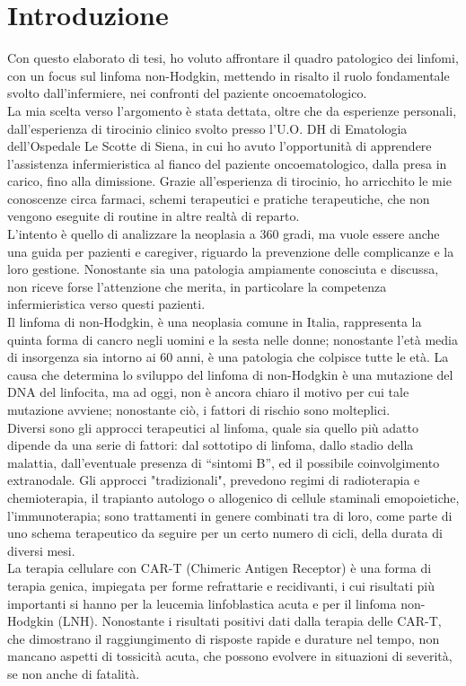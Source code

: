 \section*{Introduzione}
   
Con questo elaborato di tesi, ho voluto affrontare il quadro patologico dei linfomi, con un focus sul linfoma non-Hodgkin, 
mettendo in risalto il ruolo fondamentale svolto dall'infermiere, nei confronti del paziente oncoematologico.\\
La mia scelta verso l'argomento è stata dettata, oltre che da esperienze personali, dall'esperienza di tirocinio clinico 
svolto presso l'U.O. DH di Ematologia dell'Ospedale Le Scotte di Siena, in cui ho avuto l'opportunità di apprendere 
l'assistenza infermieristica al fianco del paziente oncoematologico, dalla presa in carico, fino alla dimissione. 
Grazie all'esperienza di tirocinio, ho arricchito le mie conoscenze circa farmaci, 
schemi terapeutici e pratiche terapeutiche, che non vengono eseguite di routine in altre realtà di reparto.\\ 
L'intento è quello di analizzare la neoplasia a 360 gradi, ma vuole essere anche 
una guida per pazienti e caregiver, riguardo la prevenzione delle 
complicanze e la loro gestione. Nonostante sia una patologia ampiamente conosciuta e discussa,
non riceve forse l'attenzione che merita, in particolare la competenza infermieristica verso questi pazienti.\\
Il linfoma di non-Hodgkin, è una neoplasia comune in Italia, rappresenta la quinta forma di cancro negli uomini e la 
sesta nelle donne; nonostante l'età media di insorgenza sia intorno ai 60 anni, è una patologia che colpisce tutte 
le età. La causa che determina lo sviluppo del linfoma di non-Hodgkin è una mutazione del DNA del linfocita, ma ad 
oggi, non è ancora chiaro il motivo per cui tale mutazione avviene; nonostante ciò, i fattori di rischio sono molteplici.\\
Diversi sono gli approcci terapeutici al linfoma, quale sia quello più adatto dipende da una serie di fattori:
dal sottotipo di linfoma, dallo stadio della malattia, dall’eventuale presenza di “sintomi B”, ed il possibile 
coinvolgimento extranodale. Gli approcci "tradizionali", prevedono regimi di radioterapia e chemioterapia,
il trapianto autologo o allogenico di cellule staminali emopoietiche, l'immunoterapia; sono trattamenti in genere 
combinati tra di loro, come parte di uno schema terapeutico da seguire per un certo numero di cicli, 
della durata di diversi mesi.\\
La terapia cellulare con CAR-T (Chimeric Antigen Receptor) è una forma di terapia genica, impiegata
per forme refrattarie e recidivanti, i cui risultati più importanti si hanno per la leucemia linfoblastica
acuta e per il linfoma non-Hodgkin (LNH).
Nonostante i risultati positivi dati dalla terapia delle CAR-T, che dimostrano il raggiungimento di
risposte rapide e durature nel tempo, non mancano aspetti di tossicità acuta, che possono evolvere
in situazioni di severità, se non anche di fatalità. 


